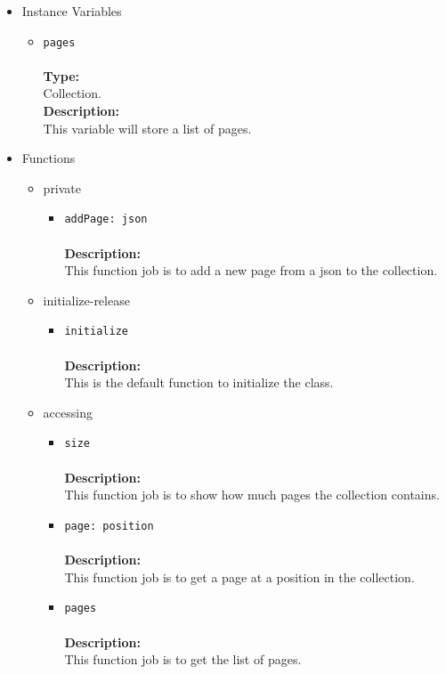 \begin{itemize}
\begin{itemize}

\item Instance Variables
\label{sec-1-4-2-6-1}%
\begin{itemize}
\item \verb~pages~\\\\
\textbf{Type:}\\
     Collection.\\

     \textbf{Description:}\\
     This variable will store a list of pages.
\end{itemize}


\item Functions
\label{sec-1-4-2-6-2}%
\begin{itemize}

\item private
\label{sec-1-4-2-6-2-1}%
\begin{itemize}
\item \verb~addPage: json~\\\\
\textbf{Description:}\\
      This function job is to add a new page from a json to the collection.\\
\end{itemize}


\item initialize-release
\label{sec-1-4-2-6-2-2}%
\begin{itemize}
\item \verb~initialize~\\\\
\textbf{Description:}\\
      This is the default function to initialize the class.
\end{itemize}


\item accessing
\label{sec-1-4-2-6-2-3}%
\begin{itemize}
\item \verb~size~\\\\
\textbf{Description:}\\
      This function job is to show how much pages the collection contains.\\
\item \verb~page: position~\\\\
\textbf{Description:}\\
      This function job is to get a page at a position in the collection.\\
\item \verb~pages~\\\\
\textbf{Description:}\\
      This function job is to get the list of pages.
\end{itemize}


\end{itemize}
\end{itemize}
\end{itemize}
